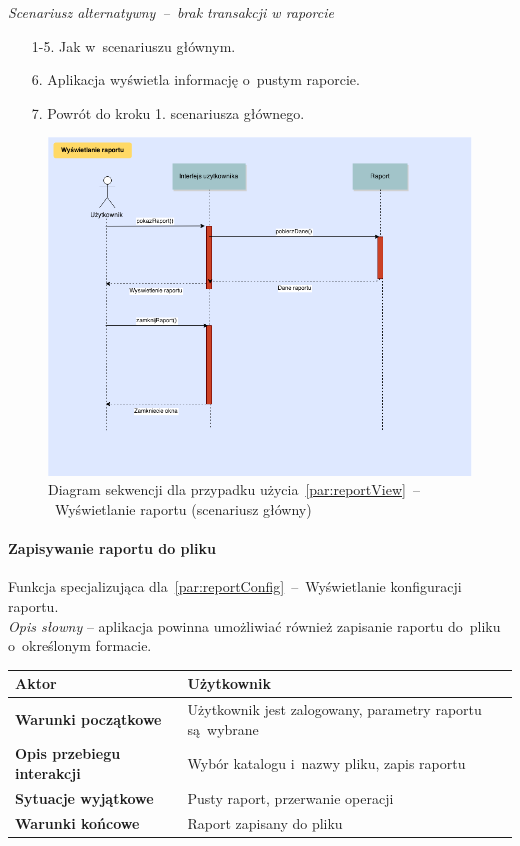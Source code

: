 \noindent \textit{Scenariusz alternatywny~--~brak transakcji w raporcie}
\begin{enumerate}
  \item[1-5.] Jak w~scenariuszu głównym.
  \item[6.] Aplikacja wyświetla informację o~pustym raporcie.
  \item[7.] Powrót do kroku 1. scenariusza głównego.
\end{enumerate}

\begin{figure}[H]
  \includegraphics[width=\textwidth]{images/raport_show.png}
  \caption{Diagram sekwencji dla przypadku użycia~\ref{par:reportView}~--~Wyświetlanie raportu (scenariusz główny)}
\end{figure}

\paragraph{Zapisywanie raportu do pliku\newline}
\label{par:reportExport}
\indent Funkcja specjalizująca dla~\ref{par:reportConfig}~--~Wyświetlanie konfiguracji raportu.\\

\textit{Opis słowny} -- aplikacja powinna umożliwiać również zapisanie raportu do~pliku o~określonym formacie.

\begin{longtable}{|p{5cm}|p{7cm}|}
  \hline \textbf{Aktor} & Użytkownik \\
  \hline \textbf{Warunki początkowe} & Użytkownik jest zalogowany, parametry raportu są~wybrane \\
  \hline \textbf{Opis przebiegu interakcji} & Wybór katalogu i~nazwy pliku, zapis raportu \\
  \hline \textbf{Sytuacje wyjątkowe} & Pusty raport, przerwanie operacji \\
  \hline \textbf{Warunki końcowe} & Raport zapisany do pliku \\
  \hline
\end{longtable}

